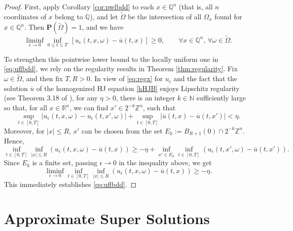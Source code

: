 \documentclass[11pt,reqno]{amsart}
\theoremstyle{definition}
\theoremstyle{remark}
\numberwithin{equation}{section}
\newcommand{\eps}{\epsilon}
\newcommand{\R}{{\mathbb{R}}}
\begin{document}
\begin{proof} First, apply Corollary \ref{cor:pwlbdd} to each $x\in \mathbb{Q}^n$ (that is, all $n$ coordinates of $x$ belong to $\mathbb{Q}$), and let $\widetilde\Omega$ be the intersection of all $\Omega_x$ found for $x \in \mathbb{Q}^n$. Then $\mathbf{P}(\widetilde\Omega) = 1$, and we have
\begin{equation}\label{lem:lbddrational}
    \liminf_{\epsilon\rightarrow 0} 
    \inf_{0\leq t \leq T} \,[u_{\epsilon}(t,x,\omega) - \overline{u}(t,x)] \ge 0, \qquad \forall x\in \mathbb{Q}^n,\, \forall \omega \in \widetilde\Omega.
\end{equation}

To strengthen this pointwise lower bound to the locally uniform one in \eqref{eq:uflbdd}, we rely on the regularity results in Theorem \ref{thm:regularity}. Fix $\omega \in \widetilde\Omega$, and then fix $T,R>0$. In view of \eqref{eq:regx} for $u_\eps$ and the fact that the solution $\overline{u}$ of the homogenized HJ equation \eqref{hHJB} enjoys Lipschitz regularity (see Theorem 3.18 of \cite{MR4328923}), for any $\eta > 0$, there is an integer $k\in \mathbb{N}$ sufficiently large so that, for all $x\in \R^n$, we can find $x'\in 2^{-k} \mathbb{Z}^n$, such that
\begin{equation*}
    \sup_{t\in [0,T]} |u_\eps(t,x,\omega) - u_\eps(t,x',\omega)| + \sup_{t\in[0,T]} |\overline{u}(t,x)-\overline{u}(t,x')| < \eta.
\end{equation*}
Moreover, for $|x|\le R$, $x'$ can be chosen from the set $E_k := B_{R+1}(0)\cap 2^{-k}\mathbb{Z}^n$. Hence,
\begin{equation*}
    \inf_{t\in [0,T]} \inf_{|x|\le R} \left(u_\eps(t,x,\omega) - \overline{u}(t,x)\right) \ge - \eta + \inf_{x'\in E_k} \inf_{t\in[0,T]} \left(u_\eps(t,x',\omega)-\overline{u}(t,x')\right) .
\end{equation*}
Since $E_k$ is a finite set, passing $\eps \to 0$ in the inequality above, we get
\begin{equation*}
    \liminf_{\eps \to 0} \inf_{t\in [0,T]} \inf_{|x|\le R} \left(u_\eps(t,x,\omega) - \overline{u}(t,x)\right) \ge -\eta.
\end{equation*}
This immediately establishes \eqref{eq:uflbdd}.
\end{proof}


\section{Approximate Super Solutions}
\label{sec:convex}
\end{document}
